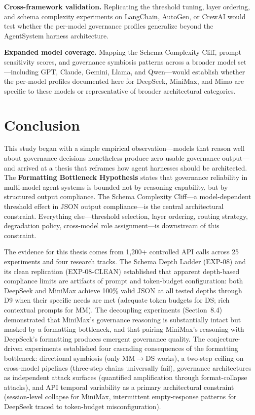 \documentclass[11pt,a4paper]{article}
\begin{document}
\textbf{Cross-framework validation.} Replicating the threshold tuning, layer ordering, and schema complexity experiments on LangChain, AutoGen, or CrewAI would test whether the per-model governance profiles generalize beyond the AgentSystem harness architecture.

\textbf{Expanded model coverage.} Mapping the Schema Complexity Cliff, prompt sensitivity scores, and governance symbiosis patterns across a broader model set---including GPT, Claude, Gemini, Llama, and Qwen---would establish whether the per-model profiles documented here for DeepSeek, MiniMax, and Mimo are specific to these models or representative of broader architectural categories.

\section{Conclusion}

This study began with a simple empirical observation---models that reason well about governance decisions nonetheless produce zero usable governance output---and arrived at a thesis that reframes how agent harnesses should be architected. The \textbf{Formatting Bottleneck Hypothesis} states that governance reliability in multi-model agent systems is bounded not by reasoning capability, but by structured output compliance. The Schema Complexity Cliff---a model-dependent threshold effect in JSON output compliance---is the central architectural constraint. Everything else---threshold selection, layer ordering, routing strategy, degradation policy, cross-model role assignment---is downstream of this constraint.

The evidence for this thesis comes from 1,200+ controlled API calls across 25 experiments and four research tracks. The Schema Depth Ladder (EXP-08) and its clean replication (EXP-08-CLEAN) established that apparent depth-based compliance limits are artifacts of prompt and token-budget configuration: both DeepSeek and MiniMax achieve 100\% valid JSON at all tested depths through D9 when their specific needs are met (adequate token budgets for DS; rich contextual prompts for MM). The decoupling experiments (Section~8.4) demonstrated that MiniMax's governance reasoning is substantially intact but masked by a formatting bottleneck, and that pairing MiniMax's reasoning with DeepSeek's formatting produces emergent governance quality. The conjecture-driven experiments established four cascading consequences of the formatting bottleneck: directional symbiosis (only MM$\rightarrow$DS works), a two-step ceiling on cross-model pipelines (three-step chains universally fail), governance architectures as independent attack surfaces (quantified amplification through format-collapse attacks), and API temporal variability as a primary architectural constraint (session-level collapse for MiniMax, intermittent empty-response patterns for DeepSeek traced to token-budget misconfiguration).
\end{document}
